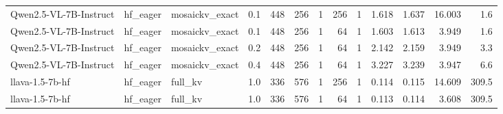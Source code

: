 \begin{tabular}{lllrrrrrrrrrr}
Qwen2.5-VL-7B-Instruct & hf\_eager & mosaickv\_exact & 0.1 & 448 & 256 & 1 & 256 & 1 & 1.618 & 1.637 & 16.003 & 1.6 \\
Qwen2.5-VL-7B-Instruct & hf\_eager & mosaickv\_exact & 0.1 & 448 & 256 & 1 & 64 & 1 & 1.603 & 1.613 & 3.949 & 1.6 \\
Qwen2.5-VL-7B-Instruct & hf\_eager & mosaickv\_exact & 0.2 & 448 & 256 & 1 & 64 & 1 & 2.142 & 2.159 & 3.949 & 3.3 \\
Qwen2.5-VL-7B-Instruct & hf\_eager & mosaickv\_exact & 0.4 & 448 & 256 & 1 & 64 & 1 & 3.227 & 3.239 & 3.947 & 6.6 \\
llava-1.5-7b-hf & hf\_eager & full\_kv & 1.0 & 336 & 576 & 1 & 256 & 1 & 0.114 & 0.115 & 14.609 & 309.5 \\
llava-1.5-7b-hf & hf\_eager & full\_kv & 1.0 & 336 & 576 & 1 & 64 & 1 & 0.113 & 0.114 & 3.608 & 309.5 \\
\bottomrule
\end{tabular}
